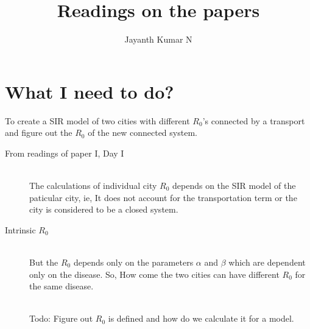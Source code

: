 \documentclass[14pt]{article}
\begin{document}
\author{Jayanth Kumar N}
\title{\textbf{Readings on the papers}}
\maketitle

\section{What I need to do?}
To create a SIR model of two cities with different $R_{0}$'s connected
by a transport and figure out the $R_{0}$ of the new connected system.

\begin{description}
\item[From readings of paper I, Day I] \hfill \\ The calculations of
  individual city $R_{0}$ depends on the SIR model of the paticular
  city, ie, It does not account for the transportation term or the
  city is considered to be a closed system.
\item[Intrinsic $R_{0}$] \hfill \\ But the $R_{0}$ depends only on the
  parameters $\alpha$ and $\beta$ which are dependent only on the
  disease. So, How come the two cities can have different $R_{0}$ for
  the same disease.
  
  \\ { \color{blue} Todo: Figure out $R_{0}$ is
    defined and how do we calculate it for a model.}

  
\end{description}
\end{document}
